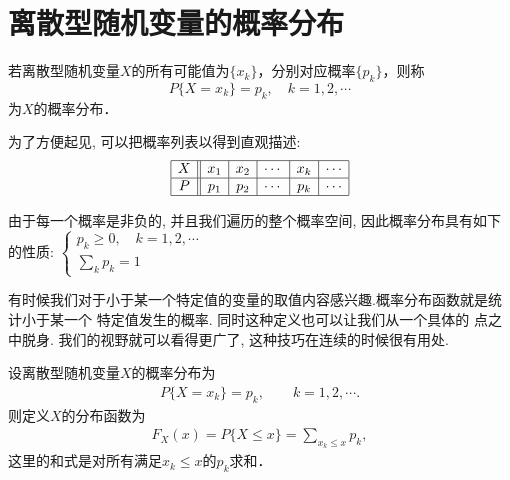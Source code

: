 \section{离散型随机变量的概率分布}

\begin{definition}[概率分布]
    若离散型随机变量$X$的所有可能值为$\{x_k\}$，分别对应概率$\{p_k\}$，则称
$$P\{X=x_k\}=p_k, \quad k=1,2,\cdots$$
为$X$的概率分布．
\end{definition}

为了方便起见, 可以把概率列表以得到直观描述: 
\[\begin{array}{|c||c|c|c|c|c|}\hline
X & x_1 & x_2 & \cdots & x_k & \cdots \\ \hline
P & p_1 & p_2 & \cdots & p_k & \cdots \\ \hline
\end{array}\]

由于每一个概率是非负的, 并且我们遍历的整个概率空间, 因此概率分布具有如下的性质:
$\displaystyle \left\{ \begin{array}{l} p_k\ge 0, \quad k=1,2,\cdots \\
\sum\limits_{k}{p_k}=1 \end{array} \right.$

有时候我们对于小于某一个特定值的变量的取值内容感兴趣.概率分布函数就是统计小于某一个
特定值发生的概率. 
 同时这种定义也可以让我们从一个具体的
点之中脱身. 我们的视野就可以看得更广了, 这种技巧在连续的时候很有用处. 

\begin{definition}[概率分布函数]
    设离散型随机变量$X$的概率分布为
    \begin{align*}
    P\{X=x_k\}=p_k,\qquad k=1,2,\cdots.
    \end{align*}
    则定义$X$的分布函数为
    \begin{align*}
    F_X(x)=P\{X\le x\}=\sum_{x_k\le x} p_k,
    \end{align*}
    这里的和式是对所有满足$x_k\le x$的$p_k$求和．
    \end{definition}

    


